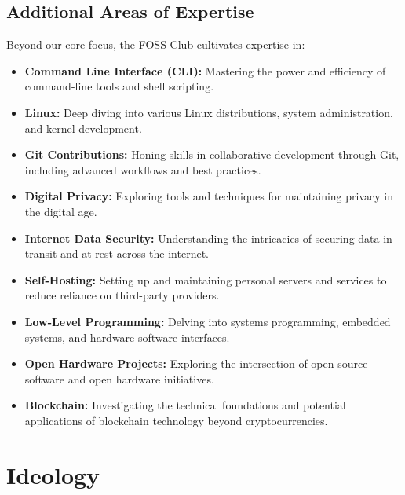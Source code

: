 \documentclass[12pt,a4paper]{article}
\begin{document}
\subsection{Additional Areas of Expertise}

Beyond our core focus, the FOSS Club cultivates expertise in:

\begin{itemize}
    \item \textbf{Command Line Interface (CLI):} Mastering the power and efficiency of command-line tools and shell scripting.
    
    \item \textbf{Linux:} Deep diving into various Linux distributions, system administration, and kernel development.
    
    \item \textbf{Git Contributions:} Honing skills in collaborative development through Git, including advanced workflows and best practices.
    
    \item \textbf{Digital Privacy:} Exploring tools and techniques for maintaining privacy in the digital age.
    
    \item \textbf{Internet Data Security:} Understanding the intricacies of securing data in transit and at rest across the internet.
    
    \item \textbf{Self-Hosting:} Setting up and maintaining personal servers and services to reduce reliance on third-party providers.
    
    \item \textbf{Low-Level Programming:} Delving into systems programming, embedded systems, and hardware-software interfaces.
    
    \item \textbf{Open Hardware Projects:} Exploring the intersection of open source software and open hardware initiatives.
    
    \item \textbf{Blockchain:} Investigating the technical foundations and potential applications of blockchain technology beyond cryptocurrencies.
\end{itemize}

\section{Ideology}
\end{document}
